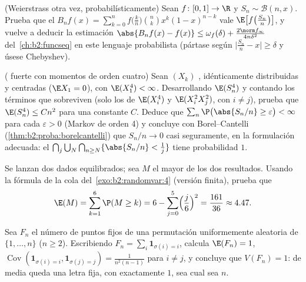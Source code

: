 \begin{exercise}[$\star\star\star$]\label{exo:b2:randomvar:8}
(Weierstrass otra vez, probabilísticamente) Sean $f \colon [0,1] \to
\R$  y $S_n \sim \mathcal{B}(n, x)$. Prueba que el  $B_nf(x) = \sum_{k=0}^n f\bigl(\frac kn\bigr)\binom nk
x^k(1-x)^{n-k}$ vale $\E\bigl[f\bigl(\frac{S_n}{n}\bigr)\bigr]$, y
vuelve a deducir la estimación $\abs{B_nf(x) - f(x)} \leq
\omega_f(\delta) + \frac{2\norm f_\infty}{4n\delta^2}$ del~\cref{ch:b2:funcseq} en este lenguaje probabilista (pártase según
$\bigl|\frac{S_n}{n} - x\bigr| \geq \delta$ y úsese Chebyshev).
\end{exercise}

\begin{exercise}[$\star\star\star$]\label{exo:b2:randomvar:9}
( fuerte con momentos de orden cuatro) Sean $(X_k)$
, idénticamente distribuidas y centradas ($\E X_1 = 0$),
con $\E(X_1^4) < \infty$. Desarrollando $\E(S_n^4)$ y contando los
términos que sobreviven (solo los de $\E(X_i^4)$ y $\E(X_i^2X_j^2)$,
con $i \neq j$), prueba que $\E(S_n^4) \leq C n^2$ para una constante
$C$. Deduce que $\sum_n \P\bigl(\abs{S_n/n} \geq \varepsilon\bigr) <
\infty$ para cada $\varepsilon > 0$ (Markov de orden 4) y concluye
con Borel--Cantelli (\cref{thm:b2:proba:borelcantelli}) que $S_n/n
\to 0$ casi seguramente, en la formulación adecuada: el 
$\bigcap_{j}\bigcup_N\bigcap_{n \geq N}\{\abs{S_n/n} < \frac1j\}$
tiene probabilidad $1$.
\end{exercise}

\begin{exercise}[$\star$]\label{exo:b2:randomvar:10}
Se lanzan dos dados equilibrados; sea $M$ el mayor de los dos
resultados. Usando la fórmula de la cola del~\cref{exo:b2:randomvar:4} (versión finita), prueba que
\[
\E(M) = \sum_{k=1}^{6}\P(M \geq k)
= 6 - \sum_{j=0}^5\Bigl(\frac j6\Bigr)^2 = \frac{161}{36}
\approx 4.47 .
\]
\end{exercise}

\begin{exercise}[$\star\star$]\label{exo:b2:randomvar:11}
Sea $F_n$ el número de puntos fijos de una permutación uniformemente
aleatoria de $\{1, \dots, n\}$ ($n \geq 2$). Escribiendo $F_n =
\sum_i\mathbf 1_{\sigma(i) = i}$, calcula $\E(F_n) = 1$,
$\operatorname{Cov}(\mathbf 1_{\sigma(i)=i}, \mathbf
1_{\sigma(j)=j}) = \frac1{n^2(n-1)}$ para $i \neq j$, y concluye que
$V(F_n) = 1$: de media queda una letra fija, con 
exactamente $1$, sea cual sea $n$.
\end{exercise}

